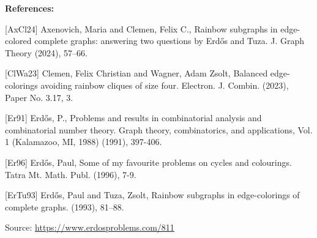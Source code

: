 \documentclass{article}
\begin{document}
\bigskip
\noindent\textbf{References:}

[AxCl24] Axenovich, Maria and Clemen, Felix C., Rainbow subgraphs in edge-colored complete graphs: answering
two questions by {E}rd\H{o}s and Tuza. J. Graph Theory (2024), 57--66.
 
 [ClWa23] Clemen, Felix Christian and Wagner, Adam Zsolt, Balanced edge-colorings avoiding rainbow cliques of size four. Electron. J. Combin. (2023), Paper No. 3.17, 3.
 
 [Er91] Erd\H{o}s, P., Problems and results in combinatorial analysis and combinatorial number theory. Graph theory, combinatorics, and applications, Vol. 1 (Kalamazoo, MI, 1988) (1991), 397-406.
 
 [Er96] Erd\H{o}s, Paul, Some of my favourite problems on cycles and colourings. Tatra Mt. Math. Publ. (1996), 7-9.
 
 [ErTu93] Erd\H{o}s, Paul and Tuza, Zsolt, Rainbow subgraphs in edge-colorings of complete graphs. (1993), 81--88.

\bigskip
\noindent\small{Source: \url{https://www.erdosproblems.com/811}}
\end{document}
